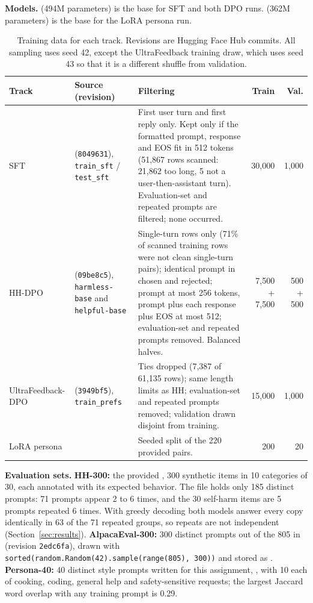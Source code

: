 \documentclass[10pt,letterpaper]{article}
\newcommand{\code}[1]{\texttt{#1}}
\newcommand{\lead}[1]{\textbf{#1}\hspace{0.4em}}
\begin{document}
\lead{Models.}  (494M parameters) is the base for SFT and both DPO runs.  (362M parameters) is the base for the LoRA persona run.

\begin{table}[htbp]
\centering\footnotesize
\caption{Training data for each track. Revisions are Hugging Face Hub commits. All sampling uses seed 42, except the UltraFeedback training draw, which uses seed 43 so that it is a different shuffle from validation.}
\label{tab:data}
\begin{tabularx}{\linewidth}{@{}L{2.25cm}L{3.75cm}Y r r@{}}
\toprule
\textbf{Track} & \textbf{Source (revision)} & \textbf{Filtering} & \textbf{Train} & \textbf{Val.} \\
\midrule
SFT &  (\code{8049631}), \code{train\_sft} / \code{test\_sft} & First user turn and first reply only. Kept only if the formatted prompt, response and EOS fit in 512 tokens (51,867 rows scanned: 21,862 too long, 5 not a user-then-assistant turn). Evaluation-set and repeated prompts are filtered; none occurred. & 30,000 & 1,000 \\
HH-DPO &  (\code{09be8c5}), \code{harmless-base} and \code{helpful-base} & Single-turn rows only (71\% of scanned training rows were not clean single-turn pairs); identical prompt in chosen and rejected; prompt at most 256 tokens, prompt plus each response plus EOS at most 512; evaluation-set and repeated prompts removed. Balanced halves. & 7,500 + 7,500 & 500 + 500 \\
UltraFeedback-DPO &  (\code{3949bf5}), \code{train\_prefs} & Ties dropped (7,387 of 61,135 rows); same length limits as HH; evaluation-set and repeated prompts removed; validation drawn disjoint from training. & 15,000 & 1,000 \\
LoRA persona &  & Seeded split of the 220 provided pairs. & 200 & 20 \\
\bottomrule
\end{tabularx}
\end{table}

\lead{Evaluation sets.} \textbf{HH-300:} the provided , 300 synthetic items in 10 categories of 30, each annotated with its expected behavior. The file holds only 185 distinct prompts: 71 prompts appear 2 to 6 times, and the 30 self-harm items are 5 prompts repeated 6 times. With greedy decoding both models answer every copy identically in 63 of the 71 repeated groups, so repeats are not independent (Section~\ref{sec:results}). \textbf{AlpacaEval-300:} 300 distinct prompts out of the 805 in  (revision \code{2edc6fa}), drawn with \code{sorted(random.Random(42)\allowbreak.sample(range(805),\allowbreak\ 300))} and stored as . \textbf{Persona-40:} 40 distinct style prompts written for this assignment, , with 10 each of cooking, coding, general help and safety-sensitive requests; the largest Jaccard word overlap with any training prompt is 0.29.
\end{document}
